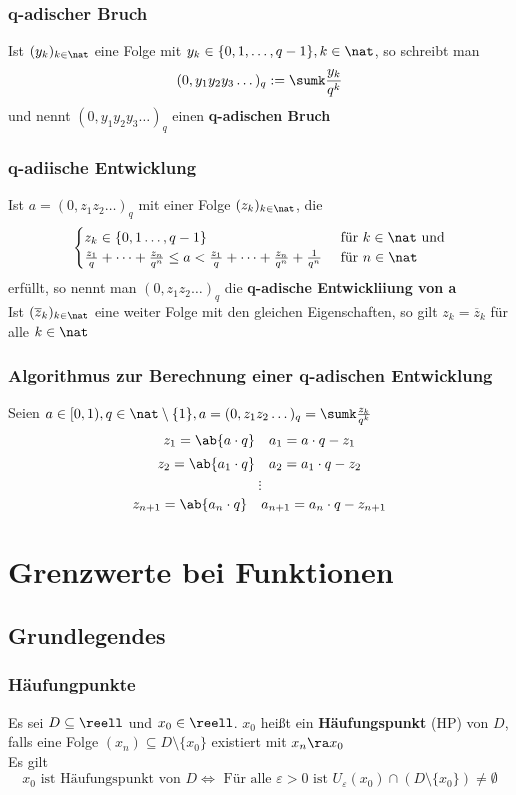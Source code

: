 \documentclass{kit}
\begin{document}
    \subsubsection{q-adischer Bruch}
      Ist $(y_k)_{k\in\nat}$ eine Folge mit $y_k\in\{0,1,\dots,q-1\},k\in\nat$, so schreibt man
      $$(0,y_1y_2y_3\dots)_q:=\sumk\frac{y_k}{q^k}$$
      und nennt $(0,y_1y_2y_3\dots)_q$ einen \textbf{q-adischen Bruch}
    \subsubsection{q-adiische Entwicklung}
      Ist $a=(0,z_1z_2\dots)_q$ mit einer Folge $(z_k)_{k\in\nat}$, die 
      $$\begin{cases}
        z_k\in\{0,1\dots,q-1\} & \text{ für }k\in\nat\text{ und}\\
        \frac{z_1}{q}+\dots+\frac{z_n}{q^n}\le a<\frac{z_1}{q}+\dots+\frac{z_n}{q^n}+\frac{1}{q^n} & \text{ für }n\in\nat
      \end{cases}$$
      erfüllt, so nennt man $(0,z_1z_2\dots)_q$ die \textbf{q-adische Entwickliiung von a}\\
      Ist $(\overline{z}_k)_{k\in\nat}$ eine weiter Folge mit den gleichen Eigenschaften, so gilt $z_k=\overline{z}_k$ für alle $k\in\nat$
    \subsubsection{Algorithmus zur Berechnung einer q-adischen Entwicklung}
      Seien $a\in[0,1),q\in\nat\setminus\{1\},a=(0,z_1z_2\dots)_q=\sumk\frac{z_k}{q^k}$
      $$z_1=\ab{a\cdot q}\quad a_1=a\cdot q-z_1$$
      $$z_2=\ab{a_1\cdot q}\quad a_2=a_1\cdot q-z_2$$
      $$\vdots$$
      $$z_{n+1}=\ab{a_n\cdot q}\quad a_{n+1}=a_n\cdot q-z_{n+1}$$
\section{Grenzwerte bei Funktionen}
  \subsection{Grundlegendes}
    \subsubsection{Häufungpunkte}
      Es sei $D\subseteq\reell$ und $x_0\in\reell$. $x_0$ heißt ein \textbf{Häufungspunkt} (HP) von $D$, falls eine Folge $(x_n)\subseteq D\setminus\{x_0\}$ existiert mit $x_n\ra x_0$\\
      Es gilt
      $$x_0\text{ ist Häufungspunkt von }D\Longleftrightarrow\text{ Für alle }\varepsilon>0\text{ ist }U_\varepsilon(x_0)\cap(D\setminus\{x_0\})\neq\emptyset$$
\end{document}
